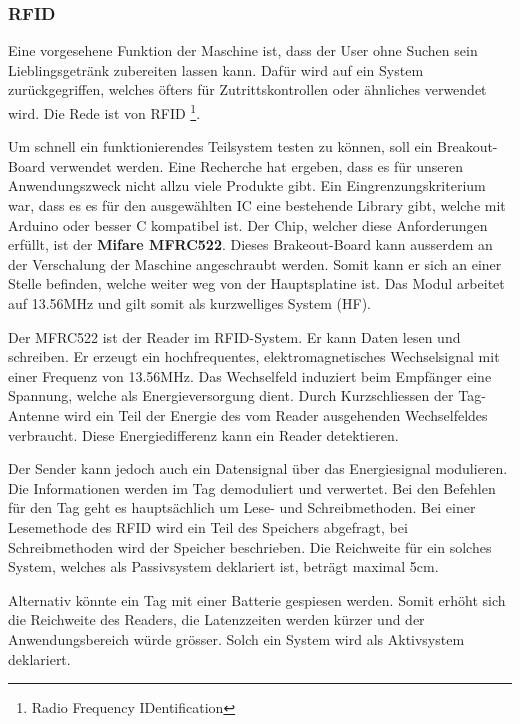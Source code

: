 \subsubsection{RFID}
\label{subsubsec:RFID}

Eine vorgesehene Funktion der Maschine ist, dass der User ohne Suchen sein Lieblingsgetränk zubereiten lassen kann. Dafür wird auf ein System zurückgegriffen, welches öfters für Zutrittskontrollen oder ähnliches verwendet wird. Die Rede ist von RFID \footnote{Radio Frequency IDentification}.

Um schnell ein funktionierendes Teilsystem testen zu können, soll ein Breakout-Board verwendet werden. Eine Recherche hat ergeben, dass es für unseren Anwendungszweck nicht allzu viele Produkte gibt. Ein Eingrenzungskriterium war, dass es es für den ausgewählten IC eine bestehende Library gibt, welche mit Arduino oder besser C kompatibel ist. Der Chip, welcher diese Anforderungen erfüllt, ist der \textbf{Mifare MFRC522}. Dieses Brakeout-Board kann ausserdem an der Verschalung der Maschine angeschraubt werden. Somit kann er sich an einer Stelle befinden, welche weiter weg von der Hauptsplatine ist.
Das Modul arbeitet auf 13.56MHz und gilt somit als kurzwelliges System (HF). \cite{nxp_semiconductors_nv_mfrc522_2017}

Der MFRC522 ist der Reader im RFID-System. Er kann Daten lesen und schreiben. Er erzeugt ein hochfrequentes, elektromagnetisches Wechselsignal mit einer Frequenz von 13.56MHz. Das Wechselfeld induziert beim Empfänger eine Spannung, welche als Energieversorgung dient. Durch Kurzschliessen der Tag-Antenne wird ein Teil der Energie des vom Reader ausgehenden Wechselfeldes verbraucht. Diese Energiedifferenz kann ein Reader detektieren.

Der Sender kann jedoch auch ein Datensignal über das Energiesignal modulieren. Die Informationen werden im Tag demoduliert und verwertet. Bei den Befehlen für den Tag geht es hauptsächlich um Lese- und Schreibmethoden. Bei einer Lesemethode des RFID wird ein Teil des Speichers abgefragt, bei Schreibmethoden wird der Speicher beschrieben. Die Reichweite für ein solches System, welches als Passivsystem deklariert ist, beträgt maximal 5cm.

Alternativ könnte ein Tag mit einer Batterie gespiesen werden. Somit erhöht sich die Reichweite des Readers, die Latenzzeiten werden kürzer und der Anwendungsbereich würde grösser. Solch ein System wird als Aktivsystem deklariert. \cite{rfid-basisde_aufbau_2018}

